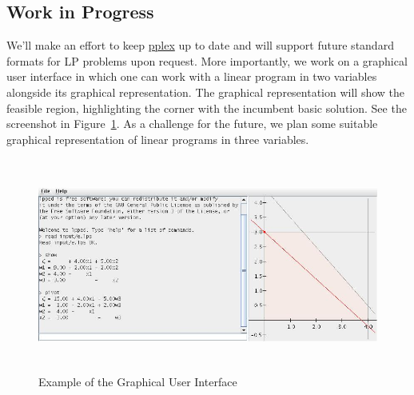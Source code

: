 \documentclass[ukenglish]{nik}
\begin{document}




\subsection{Work in Progress}\label{sec:future}
We'll make an effort to keep \url{pplex} up to date and will support 
future standard formats for LP problems upon request.
More importantly, we work on a graphical user interface in which one
can work with a linear program in two variables alongside its graphical representation. The graphical representation will show the feasible
region, highlighting the corner with the incumbent basic solution.
See the screenshot in Figure~\ref{fig:ex_gui}.
As a challenge for the future, we plan some suitable graphical
representation of linear programs in three variables.

\begin{figure}[htb]
	\begin{center}
		\includegraphics[width=150mm,height=70mm]{ex_gui.jpg}
	\end{center}
	\caption{Example of the Graphical User Interface}
	\label{fig:ex_gui}
\end{figure}
\end{document}
